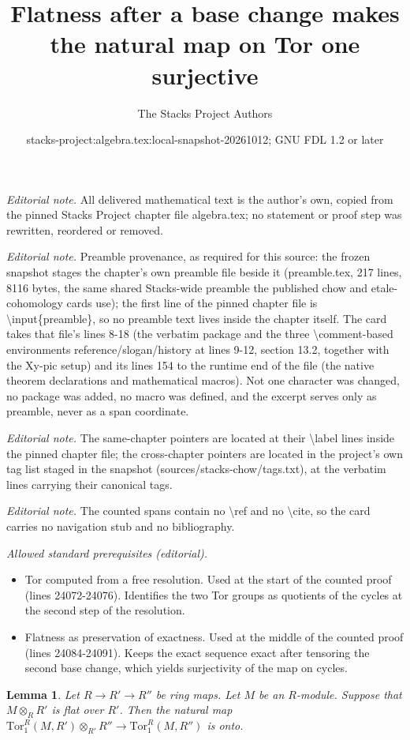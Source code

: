 \documentclass[10pt,a4paper]{amsart}
\title{Flatness after a base change makes the natural map on Tor one surjective}
\author{The Stacks Project Authors}
\date{stacks-project:algebra.tex:local-snapshot-20261012; GNU FDL 1.2 or later}
\theoremstyle{plain}
\newtheorem{lemma}[subsection]{Lemma}
\theoremstyle{definition}
\theoremstyle{remark}
\numberwithin{equation}{subsection}
\begin{document}
\maketitle
\noindent\textit{Editorial note.} All delivered mathematical text is the author's own, copied from the pinned Stacks Project chapter file algebra.tex; no statement or proof step was rewritten, reordered or removed.\par\medskip
\noindent\textit{Editorial note.} Preamble provenance, as required for this source: the frozen snapshot stages the chapter's own preamble file beside it (preamble.tex, 217 lines, 8116 bytes, the same shared Stacks-wide preamble the published chow and etale-cohomology cards use); the first line of the pinned chapter file is \textbackslash{}input\{preamble\}, so no preamble text lives inside the chapter itself. The card takes that file's lines 8-18 (the verbatim package and the three \textbackslash{}comment-based environments reference/slogan/history at lines 9-12, section 13.2, together with the Xy-pic setup) and its lines 154 to the runtime end of the file (the native theorem declarations and mathematical macros). Not one character was changed, no package was added, no macro was defined, and the excerpt serves only as preamble, never as a span coordinate.\par\medskip
\noindent\textit{Editorial note.} The same-chapter pointers are located at their \textbackslash{}label lines inside the pinned chapter file; the cross-chapter pointers are located in the project's own tag list staged in the snapshot (sources/stacks-chow/tags.txt), at the verbatim lines carrying their canonical tags.\par\medskip
\noindent\textit{Editorial note.} The counted spans contain no \textbackslash{}ref and no \textbackslash{}cite, so the card carries no navigation stub and no bibliography.\par\medskip
\noindent\textit{Allowed standard prerequisites (editorial).}\begin{itemize}
\item Tor computed from a free resolution. Used at the start of the counted proof (lines 24072-24076). Identifies the two Tor groups as quotients of the cycles at the second step of the resolution.
\item Flatness as preservation of exactness. Used at the middle of the counted proof (lines 24084-24091). Keeps the exact sequence exact after tensoring the second base change, which yields surjectivity of the map on cycles.
\end{itemize}\medskip
\begin{lemma}
\label{lemma-surjective-on-tor-one}
Let $R \to R' \to R''$ be ring maps.
Let $M$ be an $R$-module. Suppose that $M \otimes_R R'$
is flat over $R'$. Then the natural map
$\text{Tor}_1^R(M, R') \otimes_{R'} R'' \to
\text{Tor}_1^R(M, R'')$ is onto.
\end{lemma}
\end{document}
